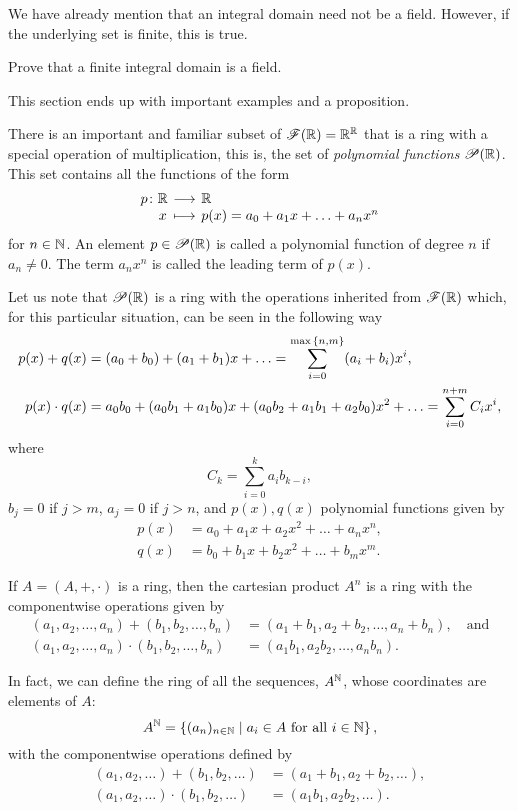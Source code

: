 \documentclass[11pt,a4paper]{article}
\begin{document}
We have already mention that an integral domain need not be a field. However, if the underlying set is finite, this is true.

\begin{eje}
    Prove that a finite integral domain is a field.
\end{eje}

This section ends up with important examples and a proposition. 

\begin{exa}
There is an important and familiar subset of $\mathscr{F}(\mathbb{R})= \mathbb{R}^{\mathbb{R}}$ that is a ring with a special operation of multiplication, this is, the set of \emph{polynomial functions} $\mathscr{P}(\mathbb{R})$. This set contains all the functions of the form
\[
\funcion{p}{\R}{\R}{x}{p(x)=a_0+a_1x+\ldots+a_nx^n}
\]
for $n\in\mathbb{N}$.
An element
$p\in \mathscr{P}(\mathbb{R})$ is called a polynomial function of degree $n$ if $a_n\neq 0$. The term $a_nx^n$ is called the leading term of $p(x).$

Let us note that $\mathscr{P}(\mathbb{R})$ is a ring with the operations inherited from  $\mathscr{F}(\mathbb{R})$ which, for this particular situation, can be seen in the following way
\begin{align*}
    p(x)+q(x)&= (a_0+b_0)+(a_1+b_1)x+\ldots=\sum_{i=0}^{\max{\left\lbrace n,m \right\rbrace}} (a_i+b_i)x^i,\\
    p(x)\cdot q(x)&= a_0b_0+(a_0b_1+a_1b_0)x+(a_0b_2+a_1b_1+a_2b_0)x^2+\ldots=\sum_{i=0}^{n+m} C_i x^i,
\end{align*}
where \[C_k=\sum_{i=0}^{k} a_ib_{k-i},\]  $b_j=0$ if $j> m$, $a_j=0$ if $j>n$, and $p(x),q(x)$ polynomial functions given by
\begin{align*}
p(x)&=a_0+a_1x+a_2x^2+\ldots+a_nx^n,\\
q(x)&=b_0+b_1x+b_2x^2+\ldots+b_mx^m.
\end{align*}


\end{exa}

\begin{exa}
If $A=(A,+,\cdot)$ is a ring, then the cartesian product $A^n$ is a ring with the componentwise operations given by 
\begin{align*}
    (a_1,a_2,\ldots,a_n)+(b_1,b_2,\ldots,b_n)&=(a_1+b_1,a_2+b_2,\ldots,a_n+b_n),\quad\text{and}\\
(a_1,a_2,\ldots,a_n)\cdot(b_1,b_2,\ldots,b_n)&=(a_1b_1,a_2b_2,\ldots,a_nb_n).
\end{align*}

In fact, we can define the ring of all the sequences, $A^{\mathbb{N}}$, whose coordinates are  elements of $A$:
\[A^{\mathbb{N}}=\left\lbrace (a_n)_{n\in \mathbb{N}} \mid a_i \in A \text{ for all } i\in\mathbb{N} \right\rbrace,\]
with the componentwise operations defined by
\begin{align*}
    (a_1,a_2,\ldots)+(b_1,b_2,\ldots)&=(a_1+b_1,a_2+b_2,\ldots),\\
(a_1,a_2,\ldots)\cdot(b_1,b_2,\ldots)&=(a_1b_1,a_2b_2,\ldots).
\end{align*}
\end{exa}
\end{document}
